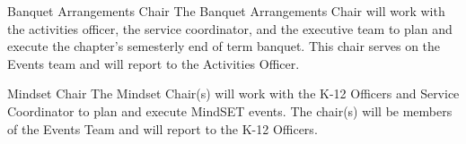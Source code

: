 \begin{enumsubsection}
\item{Banquet Arrangements Chair}
The Banquet Arrangements Chair will work with the activities officer, the service coordinator, and the executive team to plan and execute the chapter's semesterly end of term banquet.
This chair serves on the Events team and will report to the Activities Officer.

\item{Mindset Chair}
The Mindset Chair(s) will work with the K-12 Officers and Service Coordinator to plan and execute MindSET events.
The chair(s) will be members of the Events Team and will report to the K-12 Officers.







\end{enumsubsection}
